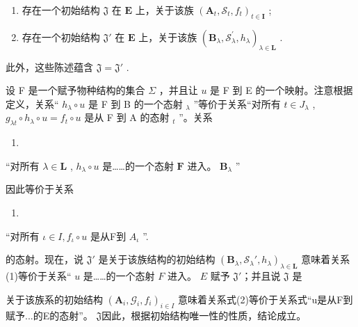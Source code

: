 \begin{enumerate}
\def\labelenumi{(\alph{enumi})}
\item
  存在一个初始结构 \(\mathfrak{J}\) 在 \(\mathbf{E}\) 上，关于该族 \((\mathbf{A}_t, \mathcal{S}_t, f_t)_{t \in \mathbf{I}}\) ;
\item
  存在一个初始结构 \(\mathfrak{J}'\) 在 \(\mathbf{E}\) 上，关于该族 \((\mathbf{B}_{\lambda},\mathcal{S}_{\lambda}^{\prime},h_{\lambda})_{\lambda \in \mathbf{L}}\) .
\end{enumerate}

此外，这些陈述蕴含 \(\mathfrak{J} = \mathfrak{J}'\) .

设 F 是一个赋予物种结构的集合 \(\Sigma\) ，并且让 \(u\) 是 F 到 E 的一个映射。注意根据定义，关系“ \(h_{\lambda} \circ u\) 是 F 到 B 的一个态射 \(_{\lambda}\) ”等价于关系“对所有 \(t \in J_{\lambda}\) , \(g_{\lambda t} \circ h_{\lambda} \circ u = f_{t} \circ u\) 是从 F 到 A 的态射 \(_{t}\) ''。关系

\begin{enumerate}
\def\labelenumi{(\arabic{enumi})}
\tightlist
\item
\end{enumerate}

``对所有 \(\lambda \in \mathbf{L}\) , \(h_{\lambda} \circ u\) 是……的一个态射 \(\mathbf{F}\) 进入。 \(\mathbf{B}_{\lambda}\) ''

因此等价于关系

\begin{enumerate}
\def\labelenumi{(\arabic{enumi})}
\setcounter{enumi}{1}
\tightlist
\item
\end{enumerate}

``对所有 \(\iota\in I,f_{\iota}\circ u\) 是从F到 \(A_{\iota}\) ''.

的态射。现在，说 \(\mathfrak{J}'\) 是关于该族结构的初始结构 \((\mathbf{B}_{\lambda}, \mathcal{S}_{\lambda}', h_{\lambda})_{\lambda \in \mathbf{L}}\) 意味着关系(1)等价于关系“ \(u\) 是……的一个态射 \(F\) 进入。 \(E\) 赋予 \(\mathfrak{J}'\)；并且说 \(\mathfrak{J}\) 是

关于该族系的初始结构 \((\mathbf{A}_{i}, \mathcal{G}_{i}, f_{i})_{i \in I}\) 意味着关系式(2)等价于关系式“u是从F到赋予...的E的态射”。 \(\mathfrak{J}\)因此，根据初始结构唯一性的性质，结论成立。

